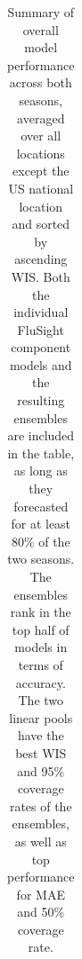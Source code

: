 \documentclass[
]{article}
\begin{document}
\newpage

\begin{longtable}[]{@{}
  >{\raggedright\arraybackslash}p{}
  >{\raggedleft\arraybackslash}p{}
  >{\raggedleft\arraybackslash}p{}
  >{\raggedleft\arraybackslash}p{}
  >{\raggedleft\arraybackslash}p{}
  >{\raggedleft\arraybackslash}p{}
  >{\raggedleft\arraybackslash}p{}@{}}

\caption{\label{tbl-overall-evaluation}Summary of overall model
performance across both seasons, averaged over all locations except the
US national location and sorted by ascending WIS. Both the individual
FluSight component models and the resulting ensembles are included in
the table, as long as they forecasted for at least 80\% of the two
seasons. The ensembles rank in the top half of models in terms of
accuracy. The two linear pools have the best WIS and 95\% coverage rates
of the ensembles, as well as top performance for MAE and 50\% coverage
rate.}

\tabularnewline


\end{longtable}
\end{document}
